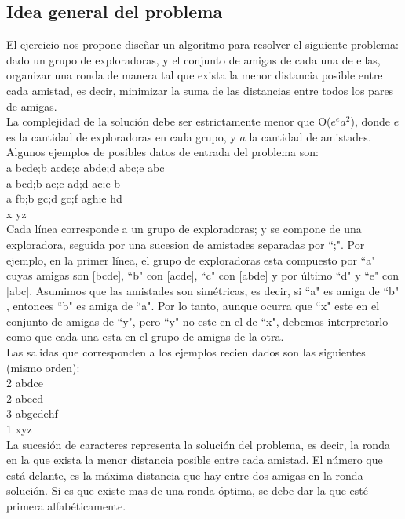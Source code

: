 \subsection{Idea general del problema}
El ejercicio nos propone diseñar un algoritmo para resolver el siguiente problema: dado un grupo de exploradoras, y el conjunto 
de amigas de cada una de ellas, organizar una ronda de manera tal que exista la menor distancia posible entre cada amistad, es 
decir, minimizar la suma de las distancias entre todos los pares de amigas.\\
La complejidad de la solución debe ser estrictamente menor que O($e^ea^2$), donde $e$ es la cantidad de exploradoras en cada grupo, y $a$ la cantidad 
de amistades. \\

Algunos ejemplos de posibles datos de entrada del problema son: \\
a bcde;b acde;c abde;d abc;e abc \\
a bcd;b ae;c ad;d ac;e b \\
a fb;b gc;d gc;f agh;e hd \\
x yz \\

Cada línea corresponde a un grupo de exploradoras; y se compone de una exploradora, seguida por una sucesion de amistades
separadas por ``;"$ $. Por ejemplo, en la primer línea, el grupo de exploradoras esta compuesto por ``a"$ $ cuyas amigas son [bcde],
``b"$ $ con [acde], ``c"$ $ con [abde] y por último ``d"$ $ y ``e"$ $ con  [abc]. Asumimos que las amistades son simétricas, es decir, si ``a"$ $ es
amiga de ``b"$ $, entonces ``b"$ $ es amiga de ``a"$ $. Por lo tanto, aunque ocurra que ``x"$ $ este en el conjunto de amigas de ``y"$ $, pero ``y"$ $ no este en el de ``x"$ $, debemos interpretarlo como que cada una esta en el grupo de amigas de la otra.  \\

Las salidas que corresponden a los ejemplos recien dados son las siguientes (mismo orden): \\
2 abdce \\
2 abecd \\
3 abgcdehf \\
1 xyz \\

La sucesión de caracteres representa la solución del problema, es decir, la ronda en la que exista la menor distancia posible entre cada amistad. El número que está delante, es la máxima distancia que hay entre dos amigas en la ronda solución. Si es que existe mas de una ronda óptima, se debe dar la que esté primera alfabéticamente. 

